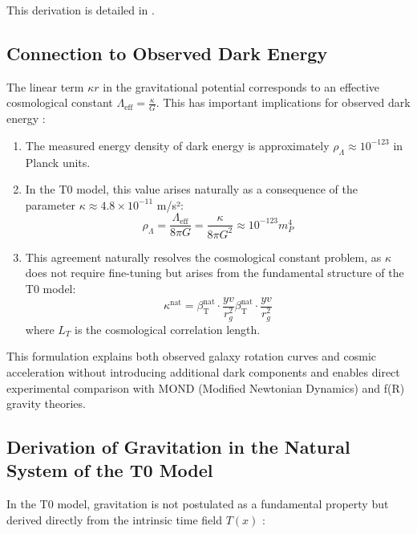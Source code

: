 \documentclass[12pt,a4paper]{article}
\newcommand{\betaT}{\beta_{\text{T}}}
\begin{document}
	This derivation is detailed in \cite{pascher_emergente_gravitation_2025}.
	
	\subsection*{Connection to Observed Dark Energy}
	
	The linear term $\kappa r$ in the gravitational potential corresponds to an effective cosmological constant $\Lambda_{\text{eff}} = \frac{\kappa}{G}$. This has important implications for observed dark energy \cite{pascher_energiedynamik_2025}:
	
	\begin{enumerate}
		\item The measured energy density of dark energy is approximately $\rho_\Lambda \approx 10^{-123}$ in Planck units.
		
		\item In the T0 model, this value arises naturally as a consequence of the parameter $\kappa \approx 4.8 \times 10^{-11}$ m/s²:
		\[
		\rho_\Lambda = \frac{\Lambda_{\text{eff}}}{8\pi G} = \frac{\kappa}{8\pi G^2} \approx 10^{-123} m_P^4
		\]
		
		\item This agreement naturally resolves the cosmological constant problem, as $\kappa$ does not require fine-tuning but arises from the fundamental structure of the T0 model:
		\[
		\kappa^{\text{nat}} = \betaT^{\text{nat}} \cdot \frac{yv}{r_g^2}\betaT^{\text{nat}} \cdot \frac{yv}{r_g^2}
		\]
		where $L_T$ is the cosmological correlation length.
	\end{enumerate}
	
	This formulation explains both observed galaxy rotation curves and cosmic acceleration without introducing additional dark components and enables direct experimental comparison with MOND (Modified Newtonian Dynamics) and f(R) gravity theories.
	
	\subsection*{Derivation of Gravitation in the Natural System of the T0 Model}
	
	In the T0 model, gravitation is not postulated as a fundamental property but derived directly from the intrinsic time field $T(x)$ \cite{pascher_emergente_gravitation_2025}:
	
\end{document}
